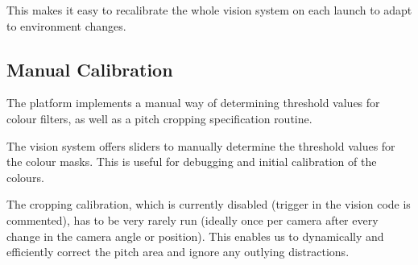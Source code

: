 This makes it easy to recalibrate the whole vision system on each launch to adapt to environment changes.

\subsection{Manual Calibration}
The platform implements a manual way of determining threshold values for colour filters, as well as a pitch cropping specification routine.

The vision system offers sliders to manually determine the threshold values for the colour masks. This is useful for debugging and initial calibration of the colours.

The cropping calibration, which is currently disabled (trigger in the vision code is commented), has to be very rarely run (ideally once per camera after every change in the camera angle or position). This enables us to dynamically and efficiently correct the pitch area and ignore any outlying distractions.